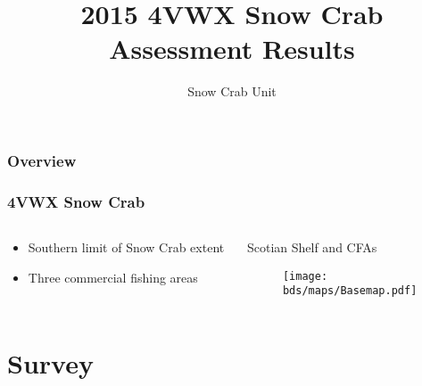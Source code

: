 \documentclass{beamer}
\title{2015 4VWX Snow Crab Assessment Results} %
\author{Snow Crab Unit} %
\institute[DFO] %
{
Department of Fisheries and Oceans \\ %
\medskip
\textit{} %
}
\date{\the\year} %
\numberwithin{equation}{section}		%
\numberwithin{figure}{section}		%
\numberwithin{table}{section}				%
\newcommand{\bd}{\string~/{bio.data}}   %
\newcommand{\bds}{\bd/{bio.snowcrab}}
\begin{document}
\begin{frame}
\titlepage %
\end{frame}

\begin{frame}
\frametitle{Overview} %
\tableofcontents %
\end{frame}




\begin{frame}
\frametitle{4VWX Snow Crab}
	\begin{columns}[T]
	\begin{column}{0.4\textwidth}
	\begin{itemize}
		\item Southern limit of Snow Crab extent
		\item Three commercial fishing areas
	\end{itemize}
	\end{column}
	
	\begin{column}{0.6\textwidth}
	\begin{centering}
	Scotian Shelf and CFAs
		\begin{figure}
  		\texttt{[image: \\bds/maps/Basemap.pdf]}
  		\end{figure}
  		\end{centering}
 	\end{column}
 	\end{columns}
\end{frame}


\section{Survey}
\end{document}
